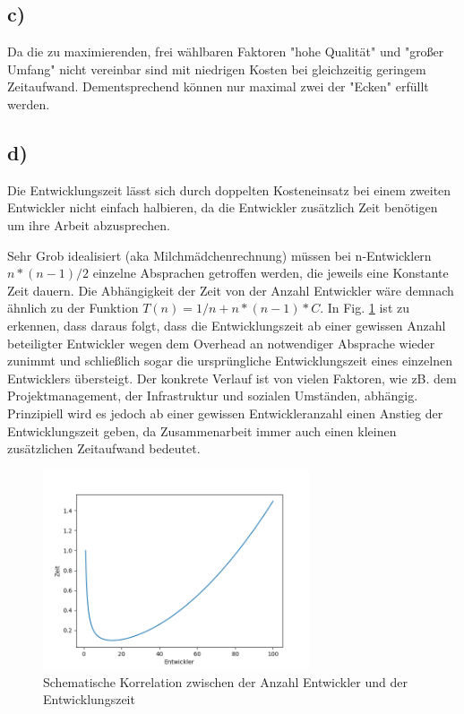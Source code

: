 \subsection*{c)}
Da die zu maximierenden, frei wählbaren Faktoren "hohe Qualität" und "großer Umfang" nicht vereinbar sind mit niedrigen Kosten bei gleichzeitig geringem Zeitaufwand. Dementsprechend können nur maximal zwei der "Ecken" erfüllt werden.

\subsection*{d)}
Die Entwicklungszeit lässt sich durch doppelten Kosteneinsatz bei einem zweiten Entwickler nicht einfach halbieren, da die Entwickler zusätzlich Zeit benötigen um ihre Arbeit abzusprechen. 

Sehr Grob idealisiert (aka Milchmädchenrechnung) müssen bei n-Entwicklern $ n*(n-1) / 2$ einzelne Absprachen getroffen werden, die jeweils eine Konstante Zeit dauern. Die Abhängigkeit der Zeit von der Anzahl Entwickler wäre demnach ähnlich zu der Funktion $T(n) = 1/n + n * (n-1) * C $. In Fig. \ref{img:plot} ist zu erkennen, dass daraus folgt, dass die Entwicklungszeit ab einer gewissen Anzahl beteiligter Entwickler wegen dem Overhead an notwendiger Absprache wieder zunimmt und schließlich sogar die ursprüngliche Entwicklungszeit eines einzelnen Entwicklers übersteigt. Der konkrete Verlauf ist von vielen Faktoren, wie zB. dem Projektmanagement, der Infrastruktur und sozialen Umständen, abhängig. Prinzipiell wird es jedoch ab einer gewissen Entwickleranzahl einen Anstieg der Entwicklungszeit geben, da Zusammenarbeit immer auch einen kleinen zusätzlichen Zeitaufwand bedeutet. 

\begin{figure} [h]
	\centering
	\includegraphics[width=0.7\textwidth]{./src/plot.png}
	\caption{Schematische Korrelation zwischen der Anzahl Entwickler und der Entwicklungszeit}
	\label{img:plot}
\end{figure}

